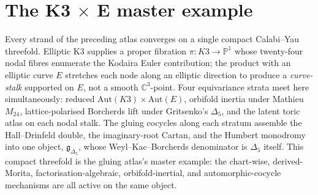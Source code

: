 \providecommand{\C}{\mathbb{C}}
\providecommand{\Z}{\mathbb{Z}}
\providecommand{\Q}{\mathbb{Q}}
\providecommand{\R}{\mathbb{R}}
\providecommand{\N}{\mathbb{N}}
\providecommand{\PP}{\mathbb{P}}
\providecommand{\cO}{\mathcal{O}}
\providecommand{\cL}{\mathcal{L}}
\providecommand{\cH}{\mathcal{H}}
\providecommand{\cA}{\mathcal{A}}
\providecommand{\cD}{\mathcal{D}}
\providecommand{\cM}{\mathcal{M}}
\providecommand{\cT}{\mathcal{T}}
\providecommand{\cF}{\mathcal{F}}
\providecommand{\Db}{D^b}
\providecommand{\Coh}{\mathrm{Coh}}
\providecommand{\Aut}{\mathrm{Aut}}
\providecommand{\End}{\mathrm{End}}
\providecommand{\Ext}{\mathrm{Ext}}
\providecommand{\Hom}{\mathrm{Hom}}
\providecommand{\Pic}{\mathrm{Pic}}
\providecommand{\rk}{\mathrm{rk}}
\providecommand{\Sp}{\mathrm{Sp}}
\providecommand{\Mp}{\mathrm{Mp}}
\providecommand{\SL}{\mathrm{SL}}
\providecommand{\GL}{\mathrm{GL}}
\providecommand{\CoHA}{\mathrm{CoHA}}
\providecommand{\Yplus}{Y^{+}}
\providecommand{\Sym}{\mathrm{Sym}}
\providecommand{\Tr}{\mathrm{Tr}}
\providecommand{\Res}{\mathrm{Res}}
\providecommand{\sg}{\mathfrak{g}}
\providecommand{\fg}{\mathfrak{g}}
\providecommand{\fh}{\mathfrak{h}}
\providecommand{\fosp}{\mathfrak{osp}}
\providecommand{\kch}{\kappa_{\mathrm{ch}}}
\providecommand{\kcat}{\kappa_{\mathrm{cat}}}
\providecommand{\kBKM}{\kappa_{\mathrm{BKM}}}
\providecommand{\kfib}{\kappa_{\mathrm{fiber}}}
\providecommand{\NCCR}{\mathrm{NCCR}}
\providecommand{\SerreS}{\mathbb{S}}
\providecommand{\Serre}{\SerreS}

\part{The K3 $\times$ E master example}
\label{gluing:part:k3xe-master}

Every strand of the preceding atlas converges on a single compact
Calabi--Yau threefold. Elliptic K3 supplies a proper fibration $\pi
\colon K3 \to \PP^1$ whose twenty-four nodal fibres enumerate the
Kodaira Euler contribution; the product with an elliptic curve $E$
stretches each node along an elliptic direction to produce a
\emph{curve-stalk} supported on $E$, not a smooth $\C^3$-point. Four
equivariance strata meet here simultaneously: reduced
$\Aut(K3)\times\Aut(E)$, orbifold inertia under Mathieu $M_{24}$,
lattice-polarised Borcherds lift under Gritsenko's $\Delta_5$, and
the latent toric atlas on each nodal stalk. The gluing cocycles along each
stratum assemble the Hall--Drinfeld double, the imaginary-root Cartan,
and the Humbert monodromy into one object, $\fg_{\Delta_5}$, whose
Weyl--Kac--Borcherds denominator is $\Delta_5$ itself. This compact
threefold is the gluing atlas's master example: the chart-wise,
derived-Morita, factorisation-algebraic, orbifold-inertial, and
automorphic-cocycle mechanisms are all active on the same object.

